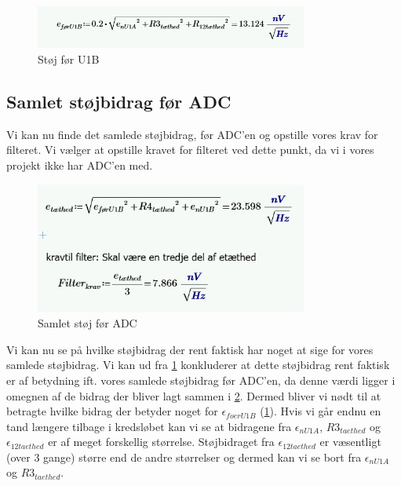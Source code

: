 \documentclass[a4paper, 11pt, article,oneside,openany]{memoir} %
\begin{document}
\begin{figure}[ht] %
	\centering
	\includegraphics[width=0.8\textwidth]{figure/foerU1b}
	\caption{Støj før U1B}
	\label{foerU1b}
\end{figure}



\subsection{Samlet støjbidrag før ADC}


Vi kan nu finde det samlede støjbidrag, før ADC'en og opstille vores krav for filteret. Vi vælger at opstille kravet for filteret ved dette punkt, da vi i vores projekt ikke har ADC'en med.

\begin{figure}[ht] %
	\centering
	\includegraphics[width=0.8\textwidth]{figure/samletstoej}
	\caption{Samlet støj før ADC}
	\label{samletstoej}
\end{figure}


Vi kan nu se på hvilke støjbidrag der rent faktisk har noget at sige for vores samlede støjbidrag. Vi kan ud fra \cref{foerU1b} konkluderer at dette støjbidrag rent faktisk er af betydning ift. vores samlede støjbidrag før ADC'en, da denne værdi ligger i omegnen af de bidrag der bliver lagt sammen i \cref{samletstoej}. Dermed bliver vi nødt til at betragte hvilke bidrag der betyder noget for $\epsilon_{foerU1B}$ (\cref{foerU1b}). Hvis vi går endnu en tand længere tilbage i kredsløbet kan vi se at bidragene fra $\epsilon_{nU1A}$, $R3_{taethed}$ og $\epsilon_{12taethed}$ er af meget forskellig størrelse. Støjbidraget fra $\epsilon_{12taethed}$ er væsentligt (over 3 gange) større end de andre størrelser og dermed kan vi se bort fra $\epsilon_{nU1A}$ og $R3_{taethed}$.
\end{document}
